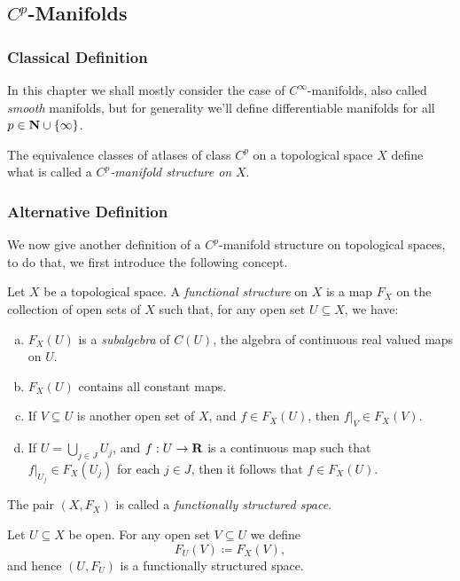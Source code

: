\subsection{\texorpdfstring{\(C^p\)}{Cp}-Manifolds}

\subsubsection{Classical Definition}

In this chapter we shall mostly consider the case of \(C^{\infty}\)-manifolds,
also called \emph{smooth} manifolds, but for generality we'll define
differentiable manifolds for all \(p \in \mathbf{N} \cup \{\infty\}\).

\begin{definition}
\label{def:Cp-manifold}
The equivalence classes of atlases of class \(C^p\) on a topological space \(X\)
define what is called a \emph{\(C^p\)-manifold structure on} \(X\).
\end{definition}

\subsubsection{Alternative Definition}

We now give another definition of a \(C^p\)-manifold structure on topological
spaces, to do that, we first introduce the following concept.

\begin{definition}
\label{def:functionally-structured-space}
Let \(X\) be a topological space. A \emph{functional structure} on \(X\) is a
map \(F_X\) on the collection of open sets of \(X\) such that, for any open set
\(U \subseteq X\), we have:
\begin{enumerate}[(a)]\setlength\itemsep{0em}
\item \(F_X(U)\) is a
  \emph{subalgebra} of \(C(U)\), the algebra of continuous real valued maps
  on \(U\).

\item \(F_X(U)\) contains all constant maps.

\item If \(V \subseteq U\) is another open set of \(X\), and \(f \in F_X(U)\),
  then \(f|_V \in F_X(V)\).

\item If \(U = \bigcup_{j \in J} U_j\), and \(f: U \to \mathbf{R}\) is a continuous map
  such that \(f|_{U_j} \in F_X(U_j)\) for each \(j \in J\), then it follows that
  \(f \in F_X(U)\).
\end{enumerate}
The pair \((X, F_X)\) is called a \emph{functionally structured space}.

Let \(U \subseteq X\) be open. For any open set \(V \subseteq U\) we define
\[
F_U(V) \coloneq F_X(V),
\]
and hence \((U, F_U)\) is a functionally structured space.
\end{definition}

